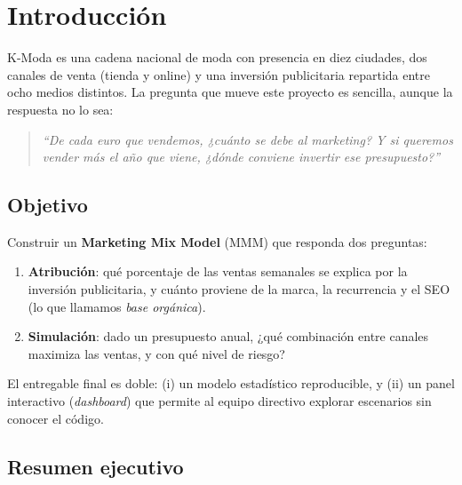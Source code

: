 \section{Introducción}

K-Moda es una cadena nacional de moda con presencia en diez ciudades, dos canales de venta (tienda y online) y una inversión publicitaria repartida entre ocho medios distintos. La pregunta que mueve este proyecto es sencilla, aunque la respuesta no lo sea:

\begin{quote}
\color{kmcharcoal}\itshape
``De cada euro que vendemos, ¿cuánto se debe al marketing? Y si queremos vender más el año que viene, ¿dónde conviene invertir ese presupuesto?''
\end{quote}

\subsection{Objetivo}

Construir un \textbf{Marketing Mix Model} (MMM) que responda dos preguntas:

\begin{enumerate}[leftmargin=*, itemsep=2pt]
    \item \textbf{Atribución}: qué porcentaje de las ventas semanales se explica por la inversión publicitaria, y cuánto proviene de la marca, la recurrencia y el SEO (lo que llamamos \textit{base orgánica}).
    \item \textbf{Simulación}: dado un presupuesto anual, ¿qué combinación entre canales maximiza las ventas, y con qué nivel de riesgo?
\end{enumerate}

El entregable final es doble: (i) un modelo estadístico reproducible, y (ii) un panel interactivo (\textit{dashboard}) que permite al equipo directivo explorar escenarios sin conocer el código.

\subsection{Resumen ejecutivo}

